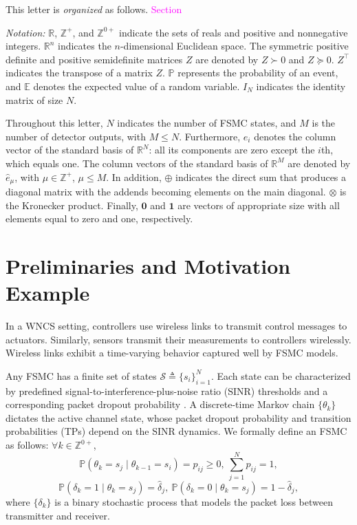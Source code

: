 \documentclass[journal,twoside,web]{ieeecolor}
\begin{document}
This letter is \emph{organized} as follows. 
\textcolor{magenta}{Section}

\textit{Notation:} $\mathbb{R}$, $\mathbb{Z}^{+}$, and $\mathbb{Z}^{0+}$ indicate the sets of reals and positive and nonnegative integers. $\mathbb{R}^{n}$ indicates the $n$-dimensional Euclidean space. The symmetric positive definite and positive semidefinite matrices $Z$ are denoted by $Z\succ 0$ and $Z\succeq 0$. $Z^{\top}$ indicates the transpose of a matrix $Z$. $\mathbb{P}$ represents the probability of an event, and $\mathbb{E}$ denotes the expected value of a random variable. $I_N$ indicates the identity matrix of size $N$. 

Throughout this letter, $N$ indicates the number of FSMC states, and $M$ is the number of detector outputs, with $M\leq N$.
Furthermore, $e_i$ denotes the column vector of the standard basis of $\mathbb{R}^{N}$: all its components are zero except the $i$th, which equals one. The column vectors of the standard basis of $\mathbb{R}^{M}$ are denoted by $\hat{e}_{\mu}$, with $\mu\in\mathbb{Z}^{+}$, $\mu\leq M$. In addition, $\oplus$ indicates the direct sum that produces a diagonal matrix with the addends becoming elements on the main diagonal. $\otimes$ is the Kronecker product. Finally, $\mathbf{0}$ and $\mathbf{1}$ are vectors of appropriate size with all elements equal to zero and one, respectively.

\section{Preliminaries and Motivation Example}\label{sec:model}
In a WNCS setting, controllers use wireless links to transmit control messages to actuators. 
Similarly, sensors transmit their measurements to controllers wirelessly. Wireless links exhibit a time-varying behavior captured well by FSMC models. 

Any FSMC has a finite set of states $\mathcal{S}\triangleq\{s_i\}_{i=1}^{N}$. Each state can be characterized by predefined signal-to-interference-plus-noise ratio (SINR) thresholds and a corresponding packet dropout probability \cite{zacchialun2024access}. A discrete-time Markov chain $\{\theta_k\}$ dictates the active channel state, whose packet dropout probability and transition probabilities (TPs) depend on the SINR dynamics. We formally define an FSMC as follows: $\forall k\in \mathbb{Z}^{0+}$,
\begin{equation}\label{eq:p-ij}
    \mathbb{P}(\theta_{k} = s_j \mid \theta_{k-1} = s_i) = p_{ij} \geq 0,~ \sum_{j=1}^N p_{ij} = 1,
\end{equation}
\begin{equation}\label{eq:p-delta}
    \mathbb{P}(\delta_k = 1 \mid \theta_{k} = s_j) = \hat{\delta}_{j},~
    \mathbb{P}(\delta_k = 0 \mid \theta_{k} = s_j) = 1 - \hat{\delta}_{j},
\end{equation}
where $\{\delta_k\}$ is a binary stochastic process that models the packet loss between transmitter and receiver.
\end{document}
